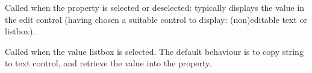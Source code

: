 
Called when the property is selected or deselected: typically displays the value
in the edit control (having chosen a suitable control to display: (non)editable text or listbox).



Called when the value listbox is selected. The default behaviour is to copy
string to text control, and retrieve the value into the property.




